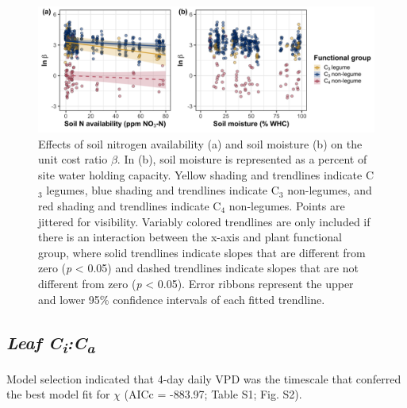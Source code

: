 \newpage
\begin{landscape}
    \begin{figure}
    \centering
    \includegraphics[scale = 0.075]{ch4_TXeco/figs/TXeco_fig2_beta.png}
    \caption[Effects of soil nitrogen availability and soil moisture on the unit cost ratio $\beta$]{Effects of soil nitrogen availability (a) and soil moisture (b) on the unit cost ratio $\beta$. In (b), soil moisture is represented as a percent of site water holding capacity. Yellow shading and trendlines indicate C$_3$ legumes, blue shading and trendlines indicate C$_3$ non-legumes, and red shading and trendlines indicate C$_4$ non-legumes. Points are jittered for visibility. Variably colored trendlines are only included if there is an interaction between the x-axis and plant functional group, where solid trendlines indicate slopes that are different from zero (\textit{p} < 0.05) and dashed trendlines indicate slopes that are not different from zero (\textit{p} < 0.05). Error ribbons represent the upper and lower 95\% confidence intervals of each fitted trendline.}
    \label{fig:figure4.2}
\end{figure}
\end{landscape}
\clearpage

\subsection{\textit{Leaf C\textsubscript{i}:C\textsubscript{a}}}
Model selection indicated that 4-day daily VPD was the timescale that conferred the best model fit for $\chi$ (AICc = -883.97; Table S1; Fig. S2).

